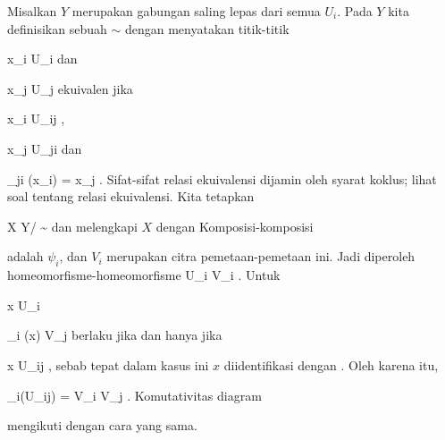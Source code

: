 Misalkan $Y$ merupakan gabungan saling lepas dari semua $U_i$. Pada $Y$ kita definisikan sebuah
$\sim$ dengan menyatakan titik-titik

\mavergleichskette
{\vergleichskette
{ x_i
}
{ \in }{ U_i
}
{  }{
}
{    }{
}
{   }{
}
}
{}{}{}
dan

\mavergleichskette
{\vergleichskette
{ x_j
}
{ \in }{ U_j
}
{  }{
}
{    }{
}
{   }{
}
}
{}{}{}
ekuivalen jika

\mavergleichskette
{\vergleichskette
{ x_i
}
{ \in }{ U_{ij}
}
{  }{
}
{    }{
}
{   }{
}
}
{}{}{,}

\mavergleichskette
{\vergleichskette
{ x_j
}
{ \in }{ U_{ji}
}
{  }{
}
{    }{
}
{   }{
}
}
{}{}{}
dan

\mavergleichskette
{\vergleichskette
{ \varphi_{ji} (x_i)
}
{ = }{ x_j
}
{  }{
}
{    }{
}
{   }{
}
}
{}{}{}.
Sifat-sifat relasi ekuivalensi dijamin oleh syarat koklus; lihat
soal tentang relasi ekuivalensi.
Kita tetapkan

\mavergleichskettedisp
{\vergleichskette
{X
}
{ } { Y/ \sim
}
{ } {
}
{ } {
}
{ } {
}
}
{}{}{}
dan melengkapi $X$ dengan
Komposisi-komposisi

 {  }

adalah $\psi_i$, dan $V_i$ merupakan citra pemetaan-pemetaan ini. Jadi diperoleh homeomorfisme-homeomorfisme
 {U_i } { V_i
} {}.
Untuk

\mavergleichskette
{\vergleichskette
{ x
}
{ \in }{ U_i
}
{  }{
}
{    }{
}
{   }{
}
}
{}{}{}

\mavergleichskettedisp
{\vergleichskette
{ \psi_i (x)
}
{ \in} { V_j
}
{ } {
}
{ } {
}
{ } {
}
}
{}{}{}
berlaku jika dan hanya jika

\mavergleichskette
{\vergleichskette
{ x
}
{ \in }{ U_{ij}
}
{  }{
}
{    }{
}
{   }{
}
}
{}{}{},
sebab tepat dalam kasus ini $x$ diidentifikasi dengan
.
Oleh karena itu,

\mavergleichskette
{\vergleichskette
{ \psi_i(U_{ij})
}
{ = }{ V_i \cap V_j
}
{  }{
}
{    }{
}
{   }{
}
}
{}{}{.}
Komutativitas diagram

 {  }

mengikuti dengan cara yang sama.
